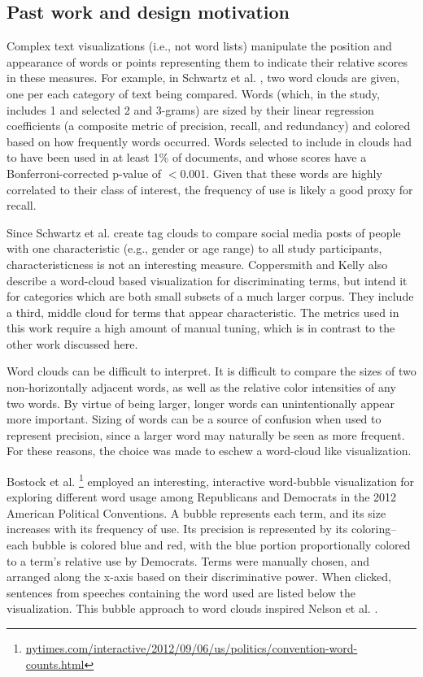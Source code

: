 \documentclass[11pt,a4paper]{article}
\begin{document}
\subsection{Past work and design motivation}
Complex text visualizations (i.e., not word lists) manipulate the position and appearance of words or points representing them to indicate their relative scores in these measures. For example, in Schwartz et al. , two word clouds are given, one per each category of text being compared.  Words (which, in the study, includes 1 and selected 2 and 3-grams) are sized by their linear regression coefficients (a composite metric of precision, recall, and redundancy) and colored based on how frequently words occurred.  Words selected to include in clouds had to have been used in at least 1\% of documents, and whose scores have a Bonferroni-corrected p-value of $<$0.001. Given that these words are highly correlated to their class of interest, the frequency of use is likely a good proxy for recall.

Since Schwartz et al.  create tag clouds to compare social media posts of people with one characteristic (e.g., gender or age range) to all study participants,  characteristicness is not an interesting measure.  Coppersmith and Kelly  also describe a word-cloud based visualization for discriminating terms, but intend it for categories which are both small subsets of a much larger corpus. They include a third, middle cloud for terms that appear characteristic.  The metrics used in this work require a high amount of manual tuning, which is in contrast to the other work discussed here.

Word clouds can be difficult to interpret.  It is difficult to compare the sizes of two non-horizontally adjacent words,  as well as the relative color intensities of any two words. By virtue of being larger, longer words can unintentionally appear more important.  Sizing of words can be a source of confusion when used to represent precision, since a larger word may naturally be seen as more frequent.  For these reasons, the choice was made to eschew a word-cloud like visualization.

Bostock et al. \footnote{\href{http://www.nytimes.com/interactive/2012/09/06/us/politics/convention-word-counts.html}{nytimes.com/interactive/2012/09/06/us/politics/convention-word-counts.html}} employed an interesting, interactive word-bubble visualization for exploring different word usage among Republicans and Democrats in the 2012 American Political Conventions.  A bubble represents each term, and its size increases with its frequency of use.  Its precision is represented by its coloring-- each bubble is colored blue and red, with the blue portion proportionally colored to a term's relative use by Democrats.  Terms were manually chosen, and arranged along the x-axis based on their discriminative power. When clicked, sentences from speeches containing the word used are listed below the visualization.  This bubble approach to word clouds inspired Nelson et al. .
\end{document}
